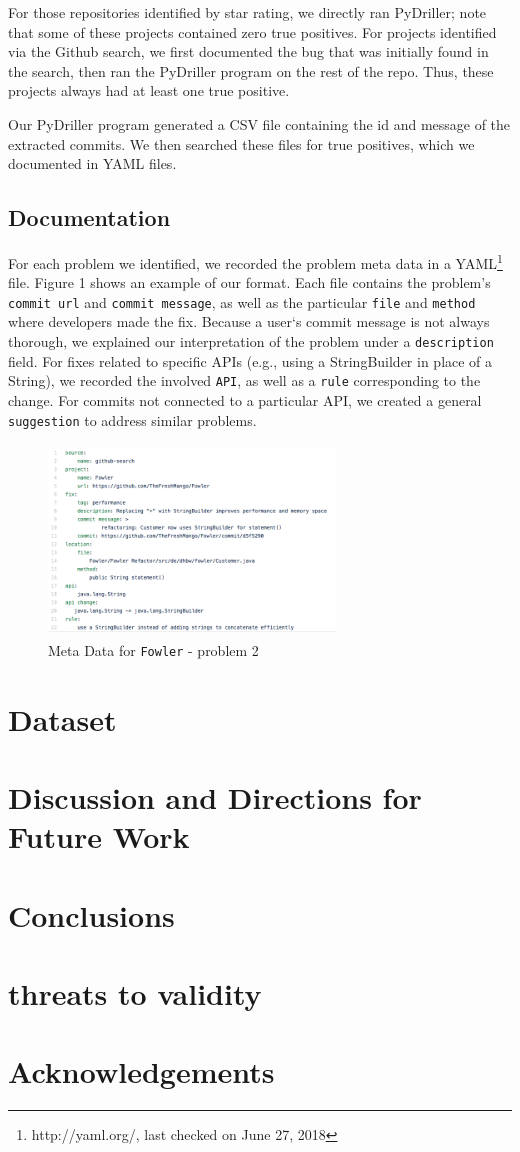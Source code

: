 \documentclass[sigconf]{acmart}
\begin{document}


For those repositories identified by star rating, we directly ran PyDriller; note that some of these projects contained zero true positives. For projects identified via the Github search, we first documented the bug that was initially found in the search, then ran the PyDriller program on the rest of the repo. Thus, these projects always had at least one true positive. 

Our PyDriller program generated a CSV file containing the id and message of the extracted commits. We then searched these files for true positives, which we documented in YAML files. 

\subsection{Documentation}
For each problem we identified, we recorded the problem meta data in a YAML\footnote{http://yaml.org/, last checked on June 27, 2018} file. Figure 1 shows an example of our format. Each file contains the problem's \texttt{commit url} and \texttt{commit message}, as well as the particular \texttt{file} and \texttt{method} where developers made the fix. Because a user`s commit message is not always thorough, we explained our interpretation of the problem under a \texttt{description} field. For fixes related to specific APIs (e.g., using a StringBuilder in place of  a String), we recorded the involved \texttt{API}, as well as a \texttt{rule} corresponding to the change. For commits not connected to a particular API, we created a general \texttt{suggestion} to address similar problems.

\begin{figure}
\includegraphics[height=2in, width=3in]{YAMLmetadata}
\caption{Meta Data for \texttt{Fowler} - problem 2}
\end{figure}


\section{Dataset}
\section{Discussion and Directions for Future Work}
\section{Conclusions}
\section*{threats to validity}


\section*{Acknowledgements}




\end{document}
